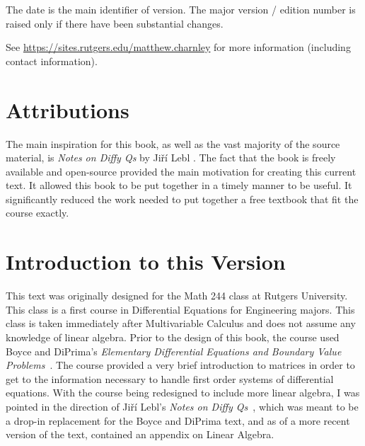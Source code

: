 \documentclass{ximera}
\begin{document}
\begin{small}
    
    \noindent
    The date is the main identifier of version.  The major version / edition number is raised only if there have been substantial changes.
    
    
    \noindent
    See \url{https://sites.rutgers.edu/matthew.charnley} for more information (including contact information).

\end{small}


\section*{Attributions}

The main inspiration for this book, as well as the vast majority of the source material, is \emph{Notes on Diffy Qs} by Ji\v{r}\'{i} Lebl \cite{JL}. The fact that the book is freely available and open-source provided the main motivation for creating this current text. It allowed this book to be put together in a timely manner to be useful. It significantly reduced the work needed to put together a free textbook that fit the course exactly.

\section*{Introduction to this Version}

This text was originally designed for the Math 244 class at Rutgers University. This class is a first course in Differential Equations for Engineering majors. This class is taken immediately after Multivariable Calculus and does not assume any knowledge of linear algebra. Prior to the design of this book, the course used Boyce and DiPrima's \emph{Elementary Differential Equations and Boundary Value Problems}~\cite{BD}. The course provided a very brief introduction to matrices in order to get to the information necessary to handle first order systems of differential equations. With the course being redesigned to include more linear algebra, I was pointed in the direction of Ji\v{r}\'{i} Lebl's \emph{Notes on Diffy Qs}~\cite{JL}, which was meant to be a drop-in replacement for the Boyce and DiPrima text, and as of a more recent version of the text, contained an appendix on Linear Algebra. 
\end{document}
